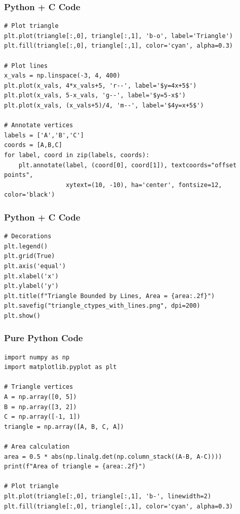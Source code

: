 \documentclass{beamer}
\begin{document}
\begin{frame}[fragile]
    \frametitle{Python + C Code}
    \lstset{language=Python}
    \begin{lstlisting}
# Plot triangle
plt.plot(triangle[:,0], triangle[:,1], 'b-o', label='Triangle')
plt.fill(triangle[:,0], triangle[:,1], color='cyan', alpha=0.3)

# Plot lines
x_vals = np.linspace(-3, 4, 400)
plt.plot(x_vals, 4*x_vals+5, 'r--', label='$y=4x+5$')
plt.plot(x_vals, 5-x_vals, 'g--', label='$y=5-x$')
plt.plot(x_vals, (x_vals+5)/4, 'm--', label='$4y=x+5$')

# Annotate vertices
labels = ['A','B','C']
coords = [A,B,C]
for label, coord in zip(labels, coords):
    plt.annotate(label, (coord[0], coord[1]), textcoords="offset points",
                 xytext=(10, -10), ha='center', fontsize=12, color='black')
    \end{lstlisting}
\end{frame}

\begin{frame}[fragile]
    \frametitle{Python + C Code}
    \lstset{language=Python}
    \begin{lstlisting}
# Decorations
plt.legend()
plt.grid(True)
plt.axis('equal')
plt.xlabel('x')
plt.ylabel('y')
plt.title(f"Triangle Bounded by Lines, Area = {area:.2f}")
plt.savefig("triangle_ctypes_with_lines.png", dpi=200)
plt.show()
    \end{lstlisting}
\end{frame}

\begin{frame}[fragile]
    \frametitle{Pure Python Code}
    \lstset{language=Python}
    \begin{lstlisting}
import numpy as np
import matplotlib.pyplot as plt

# Triangle vertices
A = np.array([0, 5])
B = np.array([3, 2])
C = np.array([-1, 1])
triangle = np.array([A, B, C, A])

# Area calculation
area = 0.5 * abs(np.linalg.det(np.column_stack((A-B, A-C))))
print(f"Area of triangle = {area:.2f}")

# Plot triangle
plt.plot(triangle[:,0], triangle[:,1], 'b-', linewidth=2)
plt.fill(triangle[:,0], triangle[:,1], color='cyan', alpha=0.3)
    \end{lstlisting}
\end{frame}
\end{document}
